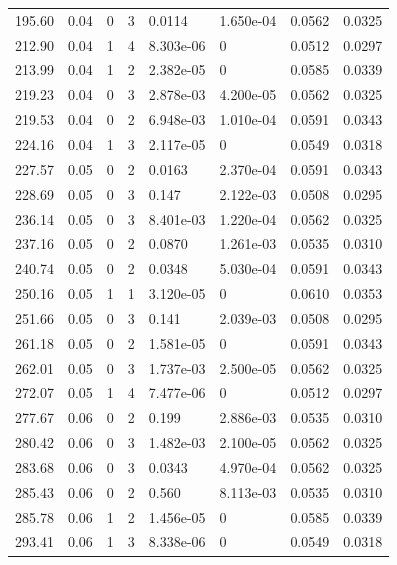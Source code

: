 \documentclass[preview]{standalone}
\begin{document}
{{{\begin{tabular}{L{1.2cm}C{1.2cm} C{0.3cm}C{0.5cm} C{1.4cm}C{1.4cm} C{1.4cm}C{1.4cm}}
  195.60  &  0.04  & 0     &  3 &  0.0114  & 1.650e-04  & 0.0562 &  0.0325   \\ 
  212.90  &  0.04  & 1     &  4 &  8.303e-06  & 0  & 0.0512 &  0.0297   \\ 
  213.99  &  0.04  & 1     &  2 &  2.382e-05  & 0  & 0.0585 &  0.0339   \\ 
  219.23  &  0.04  & 0     &  3 &  2.878e-03  & 4.200e-05  & 0.0562 &  0.0325   \\ 
  219.53  &  0.04  & 0     &  2 &  6.948e-03  & 1.010e-04  & 0.0591 &  0.0343   \\ 
  224.16  &  0.04  & 1     &  3 &  2.117e-05  & 0  & 0.0549 &  0.0318   \\ 
  227.57  &  0.05  & 0     &  2 &  0.0163  & 2.370e-04  & 0.0591 &  0.0343   \\ 
  228.69  &  0.05  & 0     &  3 &  0.147  & 2.122e-03  & 0.0508 &  0.0295   \\ 
  236.14  &  0.05  & 0     &  3 &  8.401e-03  & 1.220e-04  & 0.0562 &  0.0325   \\ 
  237.16  &  0.05  & 0     &  2 &  0.0870  & 1.261e-03  & 0.0535 &  0.0310   \\ 
  240.74  &  0.05  & 0     &  2 &  0.0348  & 5.030e-04  & 0.0591 &  0.0343   \\ 
  250.16  &  0.05  & 1     &  1 &  3.120e-05  & 0  & 0.0610 &  0.0353   \\ 
  251.66  &  0.05  & 0     &  3 &  0.141  & 2.039e-03  & 0.0508 &  0.0295   \\ 
  261.18  &  0.05  & 0     &  2 &  1.581e-05  & 0  & 0.0591 &  0.0343   \\ 
  262.01  &  0.05  & 0     &  3 &  1.737e-03  & 2.500e-05  & 0.0562 &  0.0325   \\ 
  272.07  &  0.05  & 1     &  4 &  7.477e-06  & 0  & 0.0512 &  0.0297   \\ 
  277.67  &  0.06  & 0     &  2 &  0.199  & 2.886e-03  & 0.0535 &  0.0310   \\ 
  280.42  &  0.06  & 0     &  3 &  1.482e-03  & 2.100e-05  & 0.0562 &  0.0325   \\ 
  283.68  &  0.06  & 0     &  3 &  0.0343  & 4.970e-04  & 0.0562 &  0.0325   \\ 
  285.43  &  0.06  & 0     &  2 &  0.560  & 8.113e-03  & 0.0535 &  0.0310   \\ 
  285.78  &  0.06  & 1     &  2 &  1.456e-05  & 0  & 0.0585 &  0.0339   \\ 
  293.41  &  0.06  & 1     &  3 &  8.338e-06  & 0  & 0.0549 &  0.0318   \\ 

\end{tabular}}}}
\end{document}
